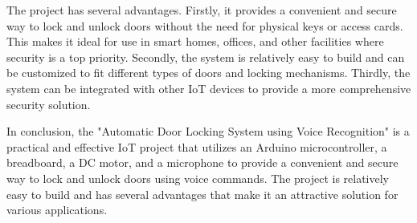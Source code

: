 \documentclass[11pt]{article}
\begin{document}
The project has several advantages. Firstly, it provides a convenient and secure way to lock and unlock doors without the need for physical keys or access cards. This makes it ideal for use in smart homes, offices, and other facilities where security is a top priority. Secondly, the system is relatively easy to build and can be customized to fit different types of doors and locking mechanisms. Thirdly, the system can be integrated with other IoT devices to provide a more comprehensive security solution.

In conclusion, the "Automatic Door Locking System using Voice Recognition" is a practical and effective IoT project that utilizes an Arduino microcontroller, a breadboard, a DC motor, and a microphone to provide a convenient and secure way to lock and unlock doors using voice commands. The project is relatively easy to build and has several advantages that make it an attractive solution for various applications.
\end{document}
